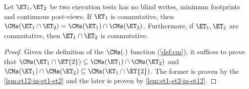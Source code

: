 \begin{theorem}                                                                            
\label{thm:et-comm}                          
Let $\ET_1, \ET_2$ be two execution tests has no blind writes, minimum footprints and continuous post-views.
If $\ET_1$ is commutative, 
then $\CMs(\ET_1 \cap \ET_2) = \CMs(\ET_1) \cap \CMs(\ET_2)$. 
Furthermore, if $\ET_1, \ET_2$ are commutative, then $\ET_1 \cap \ET_2$ 
is commutative.
\end{theorem}
\begin{proof}
Given the definition of the \( \CMs(.) \) function (\cref{def:cm}), 
it suffices to prove that \( \CMs(\ET_{1} \cap \ET{2}) \subseteq \CMs(\ET_1) \cap \CMs(\ET_2) \)
and \( \CMs(\ET_1) \cap \CMs(\ET_2) \subseteq \CMs(\ET_{1} \cap \ET{2}) \).
The former is proven by the \cref{lem:et12-in-et1-et2} and the later is proven by \cref{lem:et1-et2-in-et12}.
\end{proof}

